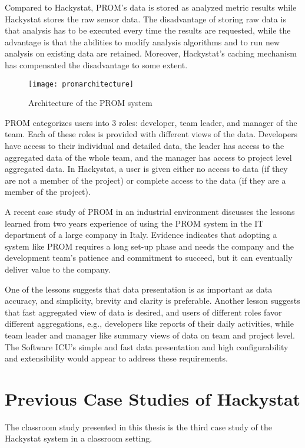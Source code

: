 Compared to Hackystat, PROM's data is stored as analyzed metric results while Hackystat stores the raw sensor data. The disadvantage of storing raw data is that analysis has to be executed every time the results are requested, while the advantage is that the abilities to modify analysis algorithms and to run new analysis on existing data are retained. Moreover, Hackystat's caching mechanism has compensated the disadvantage to some extent.

\begin{figure}[htbp]
     \centering
     \texttt{[image: promarchitecture]}
     \caption{Architecture of the PROM system}
     \label{fig:promarchitecture}
\end{figure}

PROM categorizes users into 3 roles: developer, team leader, and manager of the team. Each of these roles is provided with different views of the data. Developers have access to their individual and detailed data, the leader has access to the aggregated data of the whole team, and the manager has access to project level aggregated data. In Hackystat, a user is given either no access to data (if they are not a member of the project) or complete access to the data (if they are a member of the project).

A recent case study of PROM in an industrial environment\cite{prom09} discusses the lessons learned from two years experience of using the PROM system in the IT department of a large company in Italy. Evidence indicates that adopting a system like PROM requires a long set-up phase and needs the company and the development team's patience and commitment to succeed, but it can eventually deliver value to the company. 

One of the lessons suggests that data presentation is as important as data accuracy, and simplicity, brevity and clarity is preferable. Another lesson suggests that fast aggregated view of data is desired, and users of different roles favor different aggregations, e.g., developers like reports of their daily activities, while team leader and manager like summary views of data on team and project level. The Software ICU's simple and fast data presentation and high configurability and extensibility would appear to address these requirements.


\section {Previous Case Studies of Hackystat}
\label{oldhackystat}
The classroom study presented in this thesis is the third case study of the Hackystat system in a classroom setting. 

